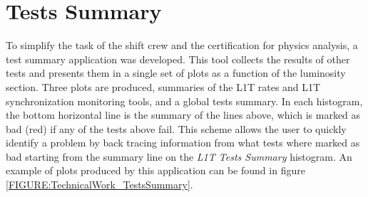 \section{Tests Summary}


To simplify the task of the shift crew and the certification for physics analysis, a test summary application was developed. This tool collects the results of other tests and presents them in a single set of plots as a function of the luminosity section. Three plots are produced, summaries of the \gls{L1T} rates and \gls{L1T} synchronization monitoring tools, and a global tests summary. In each histogram, the bottom horizontal line is the summary of the lines above, which is marked as bad (red) if any of the tests above fail. This scheme allows the user to quickly identify a problem by back tracing information from what tests where marked as bad starting from the summary line on the \textit{L1T Tests Summary} histogram. An example of plots produced by this application can be found in figure \ref{FIGURE:TechnicalWork_TestsSummary}.

